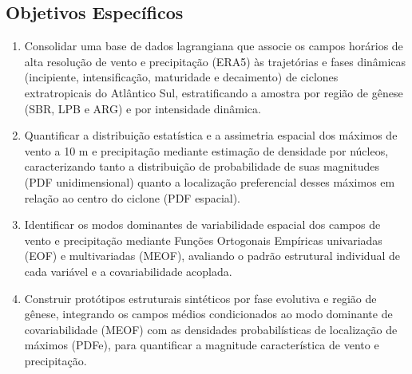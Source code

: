 \subsection{Objetivos Específicos}
\begin{enumerate}
    \item Consolidar uma base de dados lagrangiana que associe os campos horários de alta resolução de vento e precipitação (ERA5) às trajetórias e fases dinâmicas (incipiente, intensificação, maturidade e decaimento) de ciclones extratropicais do Atlântico Sul, estratificando a amostra por região de gênese (SBR, LPB e ARG) e por intensidade dinâmica.
    
    \item Quantificar a distribuição estatística e a assimetria espacial dos máximos de vento a 10 m e precipitação mediante estimação de densidade por núcleos, caracterizando tanto a distribuição de probabilidade de suas magnitudes (PDF unidimensional) quanto a localização preferencial desses máximos em relação ao centro do ciclone (PDF espacial).
    
    \item Identificar os modos dominantes de variabilidade espacial dos campos de vento e precipitação mediante Funções Ortogonais Empíricas univariadas (EOF) e multivariadas (MEOF), avaliando o padrão estrutural individual de cada variável e a covariabilidade acoplada.
    
    \item Construir protótipos estruturais sintéticos por fase evolutiva e região de gênese, integrando os campos médios condicionados ao modo dominante de covariabilidade (MEOF) com as densidades probabilísticas de localização de máximos (PDFe), para quantificar a magnitude característica de vento e precipitação.
\end{enumerate}